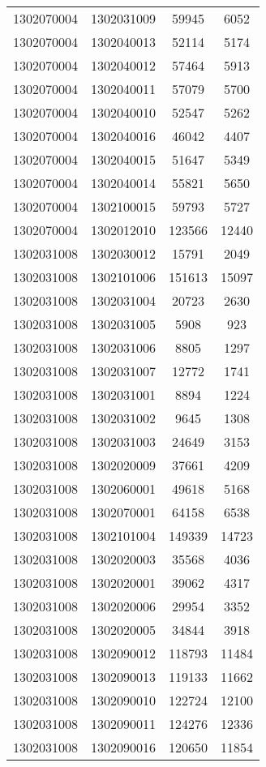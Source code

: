 \begin{longtable}{llcc}
1302070004 & 1302031009 & 59945 & 6052\\
1302070004 & 1302040013 & 52114 & 5174\\
1302070004 & 1302040012 & 57464 & 5913\\
1302070004 & 1302040011 & 57079 & 5700\\
1302070004 & 1302040010 & 52547 & 5262\\
1302070004 & 1302040016 & 46042 & 4407\\
1302070004 & 1302040015 & 51647 & 5349\\
1302070004 & 1302040014 & 55821 & 5650\\
1302070004 & 1302100015 & 59793 & 5727\\
1302070004 & 1302012010 & 123566 & 12440\\
1302031008 & 1302030012 & 15791 & 2049\\
1302031008 & 1302101006 & 151613 & 15097\\
1302031008 & 1302031004 & 20723 & 2630\\
1302031008 & 1302031005 & 5908 & 923\\
1302031008 & 1302031006 & 8805 & 1297\\
1302031008 & 1302031007 & 12772 & 1741\\
1302031008 & 1302031001 & 8894 & 1224\\
1302031008 & 1302031002 & 9645 & 1308\\
1302031008 & 1302031003 & 24649 & 3153\\
1302031008 & 1302020009 & 37661 & 4209\\
1302031008 & 1302060001 & 49618 & 5168\\
1302031008 & 1302070001 & 64158 & 6538\\
1302031008 & 1302101004 & 149339 & 14723\\
1302031008 & 1302020003 & 35568 & 4036\\
1302031008 & 1302020001 & 39062 & 4317\\
1302031008 & 1302020006 & 29954 & 3352\\
1302031008 & 1302020005 & 34844 & 3918\\
1302031008 & 1302090012 & 118793 & 11484\\
1302031008 & 1302090013 & 119133 & 11662\\
1302031008 & 1302090010 & 122724 & 12100\\
1302031008 & 1302090011 & 124276 & 12336\\
1302031008 & 1302090016 & 120650 & 11854\\

\end{longtable}
